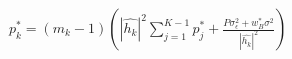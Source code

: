 \documentclass[preview]{standalone}
\begin{document}
\begin{align*}
p_k^\ast = \left(m_k-1\right) \left(\left|\hat{h_k}\right|^2 \sum_{j=1}^{K-1} {p_j^\ast} + \frac{P \sigma_{\epsilon}^2 + w_B^\ast \sigma^2}{\left|\hat{h_k}\right|^2}\right)
\end{align*}
\end{document}
